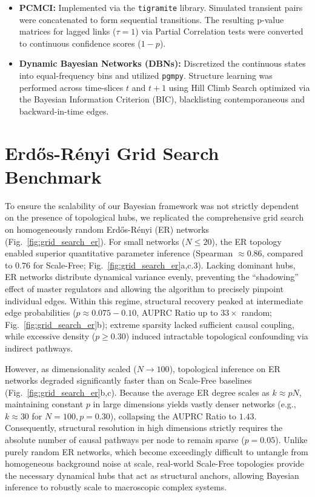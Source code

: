 \documentclass[11pt,onecolumn]{article}
\theoremstyle{definition}
\theoremstyle{remark}
\begin{document}
\begin{itemize}
    \item \textbf{PCMCI:} Implemented via the \texttt{tigramite} library. Simulated transient pairs were concatenated to form sequential transitions. The resulting p-value matrices for lagged links ($\tau = 1$) via Partial Correlation tests were converted to continuous confidence scores ($1 - p$).
    \item \textbf{Dynamic Bayesian Networks (DBNs):} Discretized the continuous states into equal-frequency bins and utilized \texttt{pgmpy}. Structure learning was performed across time-slices $t$ and $t+1$ using Hill Climb Search optimized via the Bayesian Information Criterion (BIC), blacklisting contemporaneous and backward-in-time edges.
\end{itemize}


\section{Erd\H{o}s-R\'enyi Grid Search Benchmark}



To ensure the scalability of our Bayesian framework was not strictly dependent on the presence of topological hubs, we replicated the comprehensive grid search on homogeneously random Erd\H{o}s-R\'enyi (ER) networks (Fig.~\ref{fig:grid_search_er}). For small networks ($N \le 20$), the ER topology enabled superior quantitative parameter inference (Spearman $\approx 0.86$, compared to $0.76$ for Scale-Free; Fig.~\ref{fig:grid_search_er}a,c.3). Lacking dominant hubs, ER networks distribute dynamical variance evenly, preventing the ``shadowing'' effect of master regulators and allowing the algorithm to precisely pinpoint individual edges. Within this regime, structural recovery peaked at intermediate edge probabilities ($p \approx 0.075 - 0.10$, AUPRC Ratio up to $33\times$ random; Fig.~\ref{fig:grid_search_er}b); extreme sparsity lacked sufficient causal coupling, while excessive density ($p \ge 0.30$) induced intractable topological confounding via indirect pathways. 

However, as dimensionality scaled ($N \to 100$), topological inference on ER networks degraded significantly faster than on Scale-Free baselines (Fig.~\ref{fig:grid_search_er}b,c). Because the average ER degree scales as $k \approx pN$, maintaining constant $p$ in large dimensions yields vastly denser networks (e.g., $k \approx 30$ for $N=100, p=0.30$), collapsing the AUPRC Ratio to $1.43$. Consequently, structural resolution in high dimensions strictly requires the absolute number of causal pathways per node to remain sparse ($p=0.05$). Unlike purely random ER networks, which become exceedingly difficult to untangle from homogeneous background noise at scale, real-world Scale-Free topologies provide the necessary dynamical hubs that act as structural anchors, allowing Bayesian inference to robustly scale to macroscopic complex systems.
\end{document}
